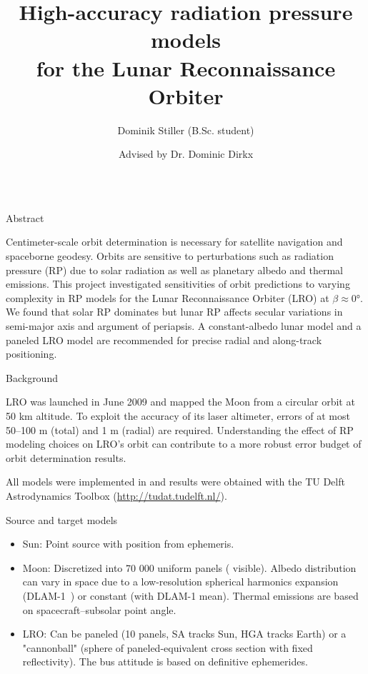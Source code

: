 \documentclass[final,20pt]{beamer}
\title{High-accuracy radiation pressure models \\ for the Lunar Reconnaissance Orbiter}
\author{Dominik Stiller (B.Sc. student) \and Advised by Dr. Dominic Dirkx}
\begin{document}
\begin{frame}[t]
\begin{columns}[t]
\separatorcolumn

\begin{column}{\colwidth}

  \begin{exampleblock}{Abstract}

    Centimeter-scale orbit determination is necessary for satellite navigation and spaceborne geodesy. Orbits are sensitive to perturbations such as radiation pressure (RP) due to solar radiation as well as planetary albedo and thermal emissions. This project investigated sensitivities of orbit predictions to varying complexity in RP models for the Lunar Reconnaissance Orbiter (LRO) at $\beta \approx \ang{0}$. We found that solar RP dominates but lunar RP affects secular variations in semi-major axis and argument of periapsis. A constant-albedo lunar model and a paneled LRO model are recommended for precise radial and along-track positioning.


  \end{exampleblock}


  \begin{block}{Background}

    LRO was launched in June 2009 and mapped the Moon from a circular orbit at 50 km altitude. To exploit the accuracy of its laser altimeter, errors of at most 50--100 m (total) and 1 m (radial) are required. Understanding the effect of RP modeling choices on LRO's orbit can contribute to a more robust error budget of orbit determination results.

    All models were implemented in and results were obtained with the TU Delft Astrodynamics Toolbox (\url{http://tudat.tudelft.nl/}).
    

  \end{block}

  \begin{block}{Source and target models}

    \begin{itemize}
      \item Sun: Point source with position from ephemeris.
      \item Moon: Discretized into 70 000 uniform panels ( visible). Albedo distribution can vary in space due to a low-resolution spherical harmonics expansion (DLAM-1~\cite{Floberghagen1999}) or constant (with DLAM-1 mean). Thermal emissions are based on spacecraft--subsolar point angle.
      \item LRO: Can be paneled (10 panels, SA tracks Sun, HGA tracks Earth) or a "cannonball" (sphere of paneled-equivalent cross section with fixed reflectivity). The bus attitude is based on definitive ephemerides.
    \end{itemize}


\end{block}
\end{column}
\end{columns}
\end{frame}
\end{document}
